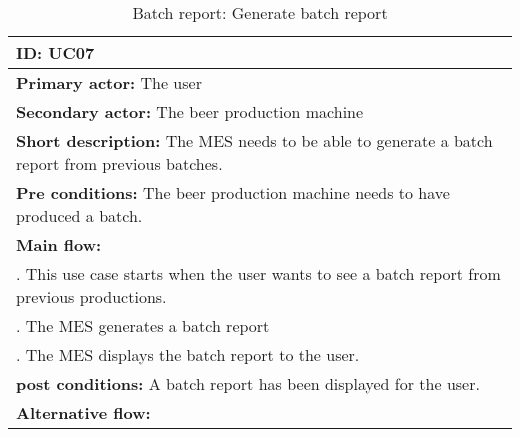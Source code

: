 \begin{table}[ht]
    \begin{tabularx}{\textwidth}{|>{\RaggedRight}X|}
        \hline
        \textbf{ID:} UC07  \\
        \hline
        \textbf{Primary actor:} The user \\
        \hline
        \textbf{Secondary actor:} The beer production machine \\
        \hline
        \textbf{Short description:} The MES needs to be able to generate a batch
        report from previous batches. \\
        \hline
        \textbf{Pre conditions:} The beer production machine needs to have
        produced a batch. \\
        \hline
        \textbf{Main flow:} \\
        	1. This use case starts when the user wants to see a batch report
        	from previous productions. \\
			2. The MES generates a batch report \\
			3. The MES displays the batch report to the user. \\
		\hline
        \textbf{post conditions:} A batch report has been displayed for the
        user. \\
        \hline
        \textbf{Alternative flow:} \\
        \hline
    \end{tabularx}
    \caption{Batch report: Generate batch report}
    \label{table:usecase_batchReport}
\end{table}